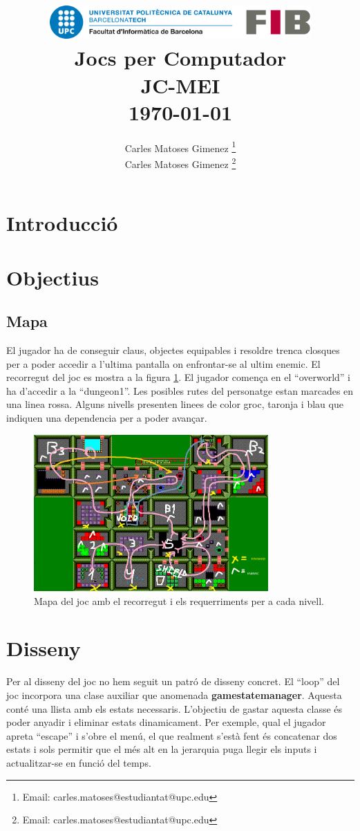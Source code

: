 \documentclass[a4paper,12pt]{article}
\title{
    \vspace{2cm} %
    \includegraphics[width=0.75\textwidth]{fib.png} \\ %
    \vspace{1cm} %
    \textbf{\Huge Jocs per Computador} \\
    \vspace{1cm} %
    \large JC-MEI \\
    \vspace{0.5cm} %
    \large \today
}
\author{
Carles Matoses Gimenez
    \thanks{
    Email: carles.matoses@estudiantat@upc.edu}\\
Carles Matoses Gimenez
    \thanks{
    Email: carles.matoses@estudiantat@upc.edu}\\
}
\date{
}
\begin{document}
\maketitle
\thispagestyle{empty}
\newpage

\setcounter{page}{1}  %
\tableofcontents
\newpage

\section{Introducció}

\section{Objectius}
\subsection{Mapa}
El jugador ha de conseguir claus, objectes equipables i resoldre trenca closques per a poder accedir a l'ultima pantalla on enfrontar-se al ultim enemic. El recorregut del joc es mostra a la figura \ref{fig:mapa}. El jugador comença en el ``overworld'' i ha d'accedir a la ``dungeon1''. Les posibles rutes del personatge estan marcades en una linea rossa. Alguns nivells presenten linees de color groc, taronja i blau que indiquen una dependencia per a poder avançar.
\begin{figure}[ht!]
    \centering
    \includegraphics[width=0.8\textwidth]{../imgs/recorregut.png} %
    \caption{Mapa del joc amb el recorregut i els requerriments per a  cada nivell.}
    \label{fig:mapa}
\end{figure}

\section{Disseny}
Per al disseny del joc no hem seguit un patró de disseny concret. El ``loop'' del joc incorpora una clase auxiliar que anomenada \textbf{gamestatemanager}. Aquesta conté una llista amb els estats necessaris. L'objectiu de gastar aquesta classe és poder anyadir i eliminar estats dinamicament. Per exemple, qual el jugador apreta ``escape'' i s'obre el menú, el que realment s'està fent és concatenar dos estats i sols permitir que el més alt en la jerarquia puga llegir els inputs i actualitzar-se en funció del temps. 
\end{document}
